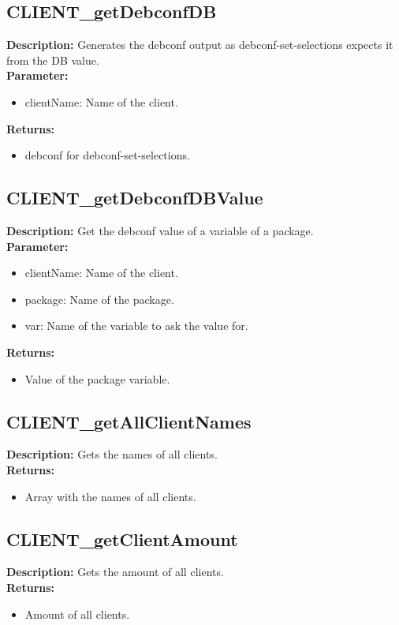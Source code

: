 \subsection{CLIENT\_getDebconfDB}
\textbf{Description:} Generates the debconf output as debconf-set-selections expects it from the DB value.\\
\textbf{Parameter:}
\begin{itemize}
\item clientName: Name of the client.
\end{itemize}
\textbf{Returns:}
\begin{itemize}
\item debconf for debconf-set-selections.
\end{itemize}

\subsection{CLIENT\_getDebconfDBValue}
\textbf{Description:} Get the debconf value of a variable of a package.\\
\textbf{Parameter:}
\begin{itemize}
\item clientName: Name of the client.
\item package: Name of the package.
\item var: Name of the variable to ask the value for.
\end{itemize}
\textbf{Returns:}
\begin{itemize}
\item Value of the package variable.
\end{itemize}

\subsection{CLIENT\_getAllClientNames}
\textbf{Description:} Gets the names of all clients.\\
\textbf{Returns:}
\begin{itemize}
\item Array with the names of all clients.
\end{itemize}

\subsection{CLIENT\_getClientAmount}
\textbf{Description:} Gets the amount of all clients.\\
\textbf{Returns:}
\begin{itemize}
\item Amount of all clients.
\end{itemize}

